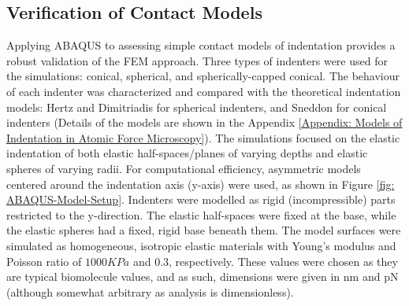 \subsection{Verification of Contact Models \label{Chapter 2: ABAQUS Applied to Contact Models} }

Applying ABAQUS to assessing simple contact models of indentation provides a robust validation of the FEM approach. Three types of indenters were used for the simulations: conical, spherical, and spherically-capped conical. The behaviour of each indenter was characterized and compared with the theoretical indentation models: Hertz\cite{kontomaris2018hertz} and Dimitriadis\cite{DIMITRIADIS20022798} for spherical indenters, and Sneddon\cite{han2021modified} for conical indenters (Details of the models are shown in the Appendix \ref{Appendix: Models of Indentation in Atomic Force Microscopy}). The simulations focused on the elastic indentation of both elastic half-spaces/planes of varying depths and elastic spheres of varying radii. For computational efficiency, asymmetric models centered around the indentation axis (y-axis) were used, as shown in Figure \ref{fig: ABAQUS-Model-Setup}. Indenters were modelled as rigid (incompressible) parts restricted to the y-direction. The elastic half-spaces were fixed at the base, while the elastic spheres had a fixed, rigid base beneath them. The model surfaces were simulated as homogeneous, isotropic elastic materials with Young's modulus and Poisson ratio of $1000 KPa$ and 0.3, respectively. These values were chosen as they are typical biomolecule values, and as such, dimensions were given in nm and pN (although somewhat arbitrary as analysis is dimensionless).


